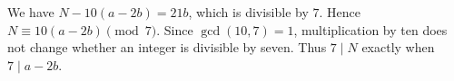 We have $N-10(a-2b)=21b$, which is divisible by $7$. Hence $N\equiv 10(a-2b)\pmod 7$. Since $\gcd(10,7)=1$, multiplication by ten does not change whether an integer is divisible by seven. Thus $7\mid N$ exactly when $7\mid a-2b$.
